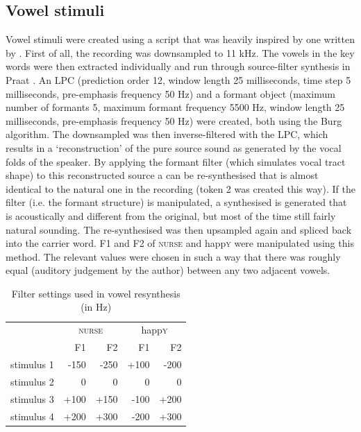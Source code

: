 \subsection{Vowel stimuli}\label{sec.perc_method.vow}

Vowel stimuli were created using a script that was heavily inspired by one written by \textcite{styler2008}.
First of all, the recording was downsampled to 11 kHz.
The vowels in the key words were then extracted individually and run through source-filter synthesis in Praat \parencite{praat}.
An LPC (prediction order 12, window length 25 milliseconds, time step 5 milliseconds, pre-emphasis frequency 50 Hz) and a formant object (maximum number of formants 5, maximum formant frequency 5500 Hz, window length 25 milliseconds, pre-emphasis frequency 50 Hz) were created, both using the Burg algorithm.
The downsampled  was then inverse-filtered with the LPC, which results in a `reconstruction' of the pure source sound as generated by the vocal folds of the speaker.
By applying the formant filter (which simulates vocal tract shape) to this reconstructed source a  can be re-synthesised that is almost identical to the natural one in the recording (token 2 was created this way).
If the filter (i.e. the formant structure) is manipulated, a synthesised  is generated that is acoustically and  different from the original, but most of the time still fairly natural sounding.
The re-synthesised  was then upsampled again and spliced back into the carrier word.
F1 and F2 of \textsc{nurse} and happ\textsc{y} were manipulated using this method.
The relevant values were chosen in such a way that there was roughly equal  (auditory judgement by the author) between any two adjacent vowels.

\begin{table}[h]
	\caption{Filter settings used in vowel resynthesis (in Hz)}
	\label{tab.vowel.stimuli}
	\centering
	\begin{tabular}{lrrrr}
		\hline
		& \multicolumn{2}{c}{\textsc{nurse}} & \multicolumn{2}{c}{happ\textsc{y}}\\
		& F1 & F2 & F1 & F2\\
		\hline
		stimulus 1 & -150 & -250 & +100 & -200\\
		stimulus 2 & 0 & 0 & 0 & 0\\
		stimulus 3 & +100 & +150 & -100 & +200\\
		stimulus 4 & +200 & +300 & -200 & +300\\
		\hline
	\end{tabular}
\end{table}

